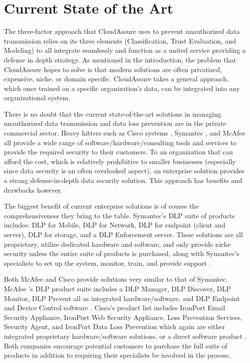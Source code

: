\section{Current State of the Art}
The three-factor approach that CloudAssure uses to prevent unauthorized data
transmission relies on its three elements (Classification, Trust Evaluation, and
Modeling) to all integrate seamlessly and function as a united service providing
a defense in depth strategy. As mentioned in the introduction, the problem that
CloudAssure hopes to solve is that modern solutions are often privatized,
expensive, niche, or domain specific. CloudAssure takes a general approach,
which once trained on a specific organization's data, can be integrated into any
organizational system.  

There is no doubt that the current state-of-the-art
solutions in managing unauthorized data transmission and data loss prevention
are in the private commercial sector. Heavy hitters such as Cisco systems \autocite{Cisco2008},
Symantec \autocite{Symantec2013}, and McAfee \autocite{McAfee2013} all provide a wide range of
software/hardware/consulting tools and services to provide the required security
to their customers. To an organization that can afford the cost, which is
relatively prohibitive to smaller businesses (especially since data security is
an often overlooked aspect), an enterprise solution provides a strong
defense-in-depth data security solution. This approach has benefits and
drawbacks however.  

The biggest benefit of current enterprise solutions is of
course the comprehensiveness they bring to the table. Symantec's \gls{DLP} suite of
products includes: \gls{DLP} for Mobile, \gls{DLP} for Network, \gls{DLP} for endpoint (client and
server), \gls{DLP} for storage, and a \gls{DLP} Enforcement server. These solutions are all
proprietary, utilize dedicated hardware and software, and only provide niche
security unless the entire suite of products is purchased, along with Symantec's
specialists to set up the system, monitor, train, and provide support \autocite{Symantec2013}.

Both McAfee and Cisco provide solutions very similar to that of Symantec. McAfee
's \gls{DLP} product suite includes a \gls{DLP} Manager, \gls{DLP} Discover,
\gls{DLP} Monitor, \gls{DLP}
Prevent all as integrated hardware/software, and \gls{DLP} Endpoint and Device Control
software \autocite{McAfee2013}. Cisco's product list includes IronPort Email Security Appliance,
IronPort Web Security Appliance, Loss Prevention Services, Security Agent, and
IronPort Data Loss Prevention which again are either integrated proprietary
hardware/software solutions, or a direct software product \autocite{Cisco2008}. Both companies
encourage potential customers to purchase the full suite of products in addition
to requiring their specialists be involved in the process.  

